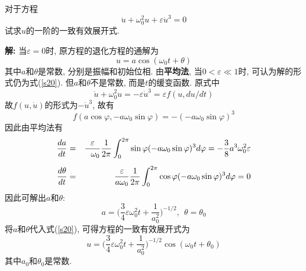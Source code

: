 \begin{problem}[习题7.4]
对于方程
\[
\ddot{u} + \omega_0^2 u + \varepsilon \dot{u}^3 = 0
\]
试求$u$的一阶的一致有效展开式.
\end{problem}

\begin{solution}
\textbf{解:} 当$\varepsilon = 0$时, 原方程的退化方程的通解为
\begin{equation}\label{s20}
u = a\cos(\omega_0 t + \theta)
\end{equation}
其中$a$和$\theta$是常数, 分别是振幅和初始位相.  由\textbf{平均法}, 当$0<\varepsilon\ll 1$时, 可认为解的形式仍为式(\ref{s20}). 但$a$和$\theta$不是常数, 而是$t$的缓变函数. 原式中
\[
\ddot{u} + \omega_0^2 u = - \varepsilon \dot{u}^3 = \varepsilon f(u, du/dt)
\]
故$f(u,\dot{u})$的形式为$-\dot{u}^3$, 故有
\[
f(a\cos\varphi, -a\omega_0\sin\varphi) = -(-a\omega_0\sin\varphi)^3
\]
因此由平均法有
\begin{eqnarray}
\frac{da}{dt}
&=& \frac{\varepsilon}{~~\omega_0}\frac{1}{2\pi}\int_0^{2\pi}
\sin\varphi (-a\omega_0\sin\varphi)^3 d\varphi = -\frac{3}{8}a^3\omega_0^2\varepsilon \nonumber\\
\noalign{\vskip5pt}
\frac{d\theta}{dt}
&=& \frac{\varepsilon}{a\omega_0}\frac{1}{2\pi}\int_0^{2\pi}
\cos\varphi (-a\omega_0\sin\varphi)^3 d\varphi = 0 \nonumber
\end{eqnarray}
因此可解出$a$和$\theta$:
\[
a = \Big(\frac{3}{4}\varepsilon\omega_0^2 t + \frac{1}{a_0^2}\Big)^{-1/2}, ~~ \theta = \theta_0
\]
将$a$和$\theta$代入式(\ref{s20}), 可得方程的一致有效展开式为
\[
u = \Big(\frac{3}{4}\varepsilon\omega_0^2 t + \frac{1}{a_0^2}\Big)^{-1/2}\cos(\omega_0 t + \theta_0)
\]
其中$a_0$和$\theta_0$是常数.

\end{solution} 
